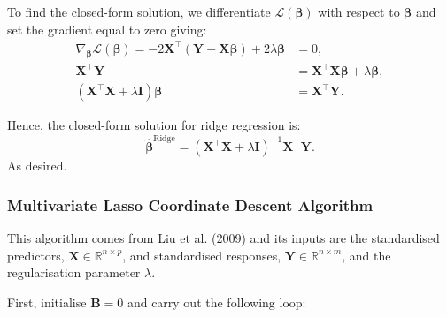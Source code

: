 \documentclass[11pt]{report} %
\begin{document}
To find the closed-form solution, we differentiate \(\mathcal{L}(\boldsymbol{\beta})\) with respect to \(\boldsymbol{\beta}\) and set the gradient equal to zero giving:
\begin{align*}
\nabla_{\boldsymbol{\beta}} \mathcal{L}(\boldsymbol{\beta}) 
    = -2 \mathbf{X}^\top (\mathbf{Y} - \mathbf{X} \boldsymbol{\beta}) + 2 \lambda \boldsymbol{\beta} &= 0, \\
\mathbf{X}^\top \mathbf{Y} 
    &= \mathbf{X}^\top \mathbf{X} \boldsymbol{\beta} + \lambda \boldsymbol{\beta}, \\
(\mathbf{X}^\top \mathbf{X} + \lambda \mathbf{I}) \boldsymbol{\beta} 
    &= \mathbf{X}^\top \mathbf{Y}.
\end{align*}

\noindent Hence, the closed-form solution for ridge regression is:
\begin{equation*}
\hat{\boldsymbol{\beta}}^{\text{Ridge}} = (\mathbf{X}^\top \mathbf{X} + \lambda \mathbf{I})^{-1} \mathbf{X}^\top \mathbf{Y}.
\end{equation*}
\noindent As desired.

\subsubsection{Multivariate Lasso Coordinate Descent Algorithm}
\label{multi-coord}

This algorithm comes from Liu et al. (2009) and its inputs are the standardised predictors, $\mathbf{X} \in \mathbb{R}^{n \times p}$, and standardised responses, $\mathbf{Y} \in \mathbb{R}^{n \times m}$, and the regularisation parameter $\lambda$.

\noindent First, initialise $\mathbf{B} = 0$ and carry out the following loop:
\end{document}
